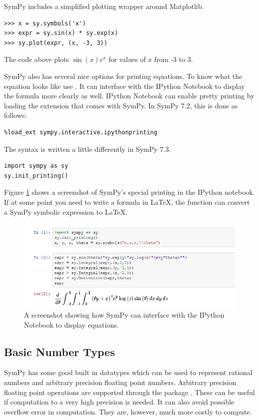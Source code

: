 SymPy includes a simplified plotting wrapper around Matplotlib.
\begin{lstlisting}
>>> x = sy.symbols('x')
>>> expr = sy.sin(x) * sy.exp(x)
>>> sy.plot(expr, (x, -3, 3))
\end{lstlisting}
The code above plots $\sin(x)e^x$ for values of $x$ from -3 to 3.

SymPy also has several nice options for printing equations.
To know what the equation looks like use .
It can interface with the IPython Notebook to display the formula more clearly as well.
IPython Notebook  can enable pretty printing by loading the extension that comes with SymPy.
In SymPy 7.2, this is done as follows:

\begin{lstlisting}
%load_ext sympy.interactive.ipythonprinting
\end{lstlisting}

The syntax is written a little differently in SymPy 7.3.

\begin{lstlisting}
import sympy as sy
sy.init_printing()
\end{lstlisting}

Figure \ref{sympy:pretty_printing} shows a screenshot of SymPy's special printing in the IPython notebook.
If at some point you need to write a formula in \LaTeX, the function  can convert a SymPy symbolic expression to \LaTeX{}.

\begin{figure}[H]
\includegraphics[width=\textwidth]{pretty_printing.png}
\caption{A screenshot showing how SymPy can interface with the IPython Notebook to display equations.}
\label{sympy:pretty_printing}
\end{figure}

\subsection*{Basic Number Types}%
SymPy has some good built in datatypes which can be used to represent rational numbers and arbitrary precision floating point numbers.
Arbitrary precision floating point operations are supported through the package .
These can be useful if computation to a very high precision is needed. It can also avoid possible overflow error in computation.
They are, however, much more costly to compute.

